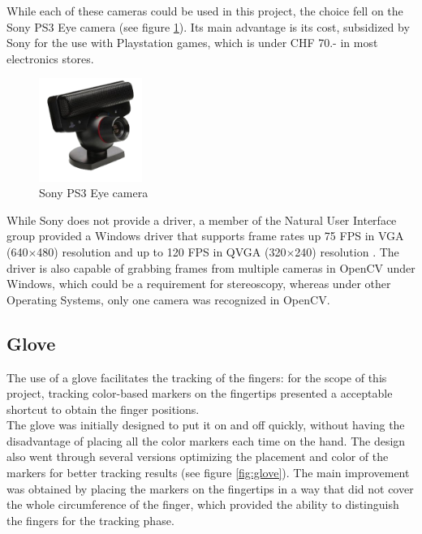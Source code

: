 While each of these cameras could be used in this project, the choice fell on the Sony PS3 Eye camera (see figure \ref{fig:ps3-eye}). Its main advantage is its cost, subsidized by Sony for the use with Playstation games, which is under CHF 70.- in most electronics stores.

\begin{figure}[H]
\center
\includegraphics[width=0.3\textwidth]{images/ps3eye} 
\caption{Sony PS3 Eye camera}
\label{fig:ps3-eye}
\end{figure}

While Sony does not provide a driver, a member of the Natural User Interface group \cite{nuigroup} provided a Windows driver that supports frame rates up 75 FPS in VGA (640$\times$480) resolution and up to 120 FPS in QVGA (320$\times$240) resolution \cite{codelab}. The driver is also capable of grabbing frames from multiple cameras in OpenCV under Windows, which could be a requirement for stereoscopy, whereas under other Operating Systems, only one camera was recognized in OpenCV.
 
\subsection{Glove}
\label{sub:glove}

The use of a glove facilitates the tracking of the fingers: for the scope of this project, tracking color-based markers on the fingertips presented a acceptable shortcut to obtain the finger positions. \\
The glove was initially designed to put it on and off quickly, without having the disadvantage of placing all the color markers each time on the hand. The design also went through several versions optimizing the placement and color of the markers for better tracking results (see figure \ref{fig:glove}).
The main improvement was obtained by placing the markers on the fingertips in a way that did not cover the whole circumference of the finger, which provided the ability to distinguish the fingers for the tracking phase.

